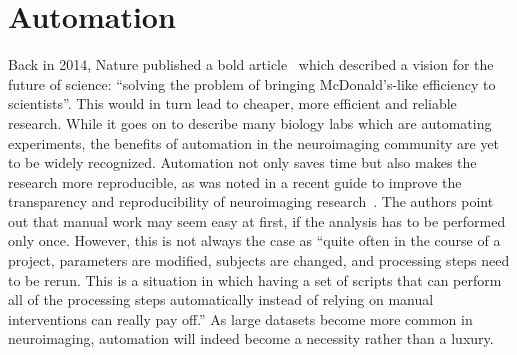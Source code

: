 \section{Automation}
Back in 2014, Nature published a bold article~\citep{hayden2014automated} which described a vision for the future of science: ``solving the problem of bringing McDonald's-like efficiency to scientists''. This would in turn lead to cheaper, more efficient and reliable research. While it goes on to describe many biology labs which are automating experiments, the benefits of automation in the neuroimaging community are yet to be widely recognized. Automation not only saves time but also makes the research more reproducible, as was noted in a recent guide to improve the transparency and reproducibility of neuroimaging research~\citep{gorgolewski2016practical}. The authors point out that manual work may seem easy at first, if the analysis has to be performed only once. However, this is not always the case as ``quite often in the course of a project, parameters are modified, subjects are changed, and processing steps need to be rerun. This is a situation in which having a set of scripts that can perform all of the processing steps automatically instead of relying on manual interventions can really pay off.'' As large datasets become more common in neuroimaging, automation will indeed become a necessity rather than a luxury.

